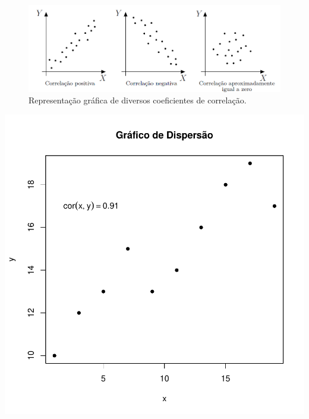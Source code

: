\documentclass[14pt,aspectratio=1610]{beamer}
\begin{document}
\begin{frame}{}
\frametitle{}
\begin{block}{}
\begin{figure}[H]
    \centering
    \includegraphics[scale=0.5]{figs/correlacao}
    \caption{Representação gráfica de diversos coeficientes de correlação.}
  \end{figure}
\end{block}
\end{frame}

\begin{frame}[fragile]{}
\begin{center}
\includegraphics{Aula3-003}
\end{center}
\end{frame}
\end{document}
